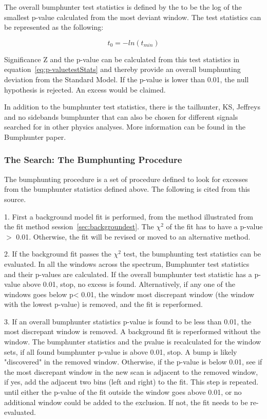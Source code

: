     The overall bumphunter test statistics is defined by the to be the log of the smallest p-value calculated from the most deviant window. The test statistics can be represented as the following:

    \begin{equation}
        t_{0} = - ln (t_{min}) 
    \end{equation}

    Significance Z and the p-value can be calculated from this test statistics in equation~\ref{eq:p-valuetestStats} and thereby provide an overall bumphunting deviation from the Standard Model. If the p-value is lower than 0.01, the null hypothesis is rejected. An excess would be claimed. 

    In addition to the bumphunter test statistics, there is the tailhunter, KS, Jeffreys and no sidebands bumphunter that can also be chosen for different signals searched for in other physics analyses. More information can be found in the Bumphunter paper\cite{choudalakis2011hypothesis}.

    \subsubsection{The Search: The Bumphunting Procedure}
    The bumphunting procedure is a set of procedure defined to look for excesses from the bumphunter statistics defined above. The following is cited from this source\cite{Pachal:206032}.

    1.  First a background model fit is performed, from the method illustrated from the fit method session~\ref{sec:backgroundest}. The $\chi^{2}$ of the fit has to have a p-value $>$ 0.01. Otherwise, the fit will be revised or moved to an alternative method.

    2.  If the background fit passes the $\chi^{2}$ test, the bumphunting test statistics can be evaluated. In all the windows across the spectrum, Bumphunter test statistics and their p-values are calculated. If the overall bumphunter test statistic has a p-value above 0.01, stop, no excess is found. Alternatively, if any one of the windows goes below p< 0.01, the window most discrepant window (the window with the lowest p-value) is removed, and the fit is reperformed.

    3. If an overall bumphunter statistics p-value is found to be less than 0.01, the most discrepant window is removed. A background fit is reperformed without the window. The bumphunter statistics and the pvalue is recalculated for the window sets, if all found bumphunter p-value is above 0.01, stop. A bump is likely "discovered" in the removed window. Otherwise, if the p-value is below 0.01, see if the most discrepant window in the new scan is adjacent to the removed window, if yes, add the
    adjacent two bins (left and right) to the fit. This step is repeated. until either the p-value of the fit outside the window goes above 0.01, or no additional window could be added to the exclusion. If not, the fit needs to be re-evaluated.

